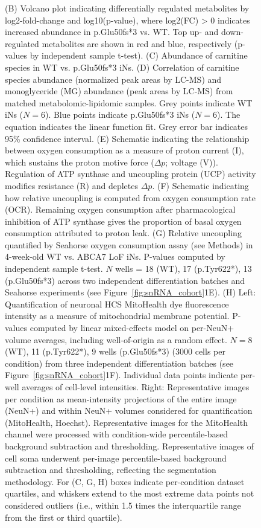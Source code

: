 \begin{figure}[ht]
{        (B) Volcano plot indicating differentially regulated metabolites by log2-fold-change and log10(p-value), where log2(FC) > 0 indicates increased abundance in p.Glu50fs*3 vs. WT. Top up- and down-regulated metabolites are shown in red and blue, respectively (p-values by independent sample t-test). 
        (C) Abundance of carnitine species in WT vs. p.Glu50fs*3 iNs. 
        (D) Correlation of carnitine species abundance (normalized peak areas by LC-MS) and monoglyceride (MG) abundance (peak areas by LC-MS) from matched metabolomic-lipidomic samples. Grey points indicate WT iNs ($N=6$). Blue points indicate p.Glu50fs*3 iNs ($N=6$). The equation indicates the linear function fit. Grey error bar indicates 95\% confidence interval. 
        (E) Schematic indicating the relationship between oxygen consumption as a measure of proton current (I), which sustains the proton motive force ($\Delta p$; voltage (V)). Regulation of ATP synthase and uncoupling protein (UCP) activity modifies resistance (R) and depletes $\Delta p$. 
        (F) Schematic indicating how relative uncoupling is computed from oxygen consumption rate (OCR). Remaining oxygen consumption after pharmacological inhibition of ATP synthase gives the proportion of basal oxygen consumption attributed to proton leak. 
        (G) Relative uncoupling quantified by Seahorse oxygen consumption assay (see Methods) in 4-week-old WT vs. ABCA7 LoF iNs. P-values computed by independent sample t-test. $N$ wells = 18 (WT), 17 (p.Tyr622*), 13 (p.Glu50fs*3) across two independent differentiation batches and Seahorse experiments (see Figure~\ref{fig:snRNA_cohort}1E). 
        (H) Left: Quantification of neuronal HCS MitoHealth dye fluorescence intensity as a measure of mitochondrial membrane potential. P-values computed by linear mixed-effects model on per-NeuN+ volume averages, including well-of-origin as a random effect. $N=8$ (WT), 11 (p.Tyr622*), 9 wells (p.Glu50fs*3) (3000 cells per condition) from three independent differentiation batches (see Figure~\ref{fig:snRNA_cohort}1F). Individual data points indicate per-well averages of cell-level intensities. Right: Representative images per condition as mean-intensity projections of the entire image (NeuN+) and within NeuN+ volumes considered for quantification (MitoHealth, Hoechst). Representative images for the MitoHealth channel were processed with condition-wide percentile-based background subtraction and thresholding. Representative images of cell soma underwent per-image percentile-based background subtraction and thresholding, reflecting the segmentation methodology. For (C, G, H) boxes indicate per-condition dataset quartiles, and whiskers extend to the most extreme data points not considered outliers (i.e., within 1.5 times the interquartile range from the first or third quartile). 
    }
    \label{fig:main_mitochondrial}
\end{figure}